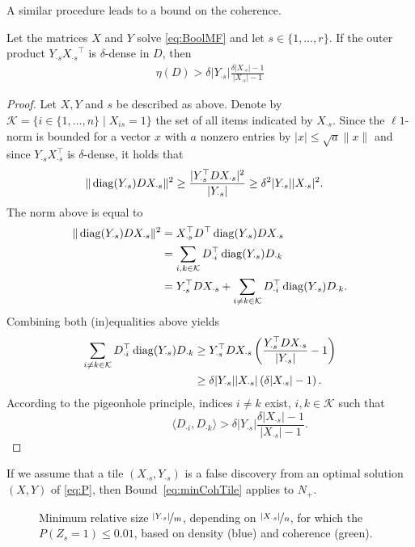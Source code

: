 %
A similar procedure leads to a bound on the coherence.
\begin{lemma} \label{thm:minCohTile}
Let the matrices $X$ and $Y$ solve \eqref{eq:BoolMF} and let $s\in\{1,\ldots,r\}$. If the outer product $Y_{\cdot s}{X_{\cdot s}}^\top$ is $\delta$-dense in $D$, then
\begin{align}
\eta(D) > \delta|Y_{\cdot s}|\frac{\delta|X_{\cdot s}|-1}{|X_{\cdot s}|-1}\label{eq:minCohTile}
\end{align}
\end{lemma}
%
\begin{proof}
Let $X,Y$ and $s$ be described as above. Denote by $\mathcal{K}=\{i\in\{1,\ldots, n\}\mid X_{is}=1\}$ the set of all items indicated by $X_{\cdot s}$. Since the $\ell1$-norm is bounded for a vector $x$ with $a$ nonzero entries by $|x|\leq\sqrt{a}\|x\|$ and since $Y_{\cdot s}X_{\cdot s}^\top$ is $\delta$-dense, it holds that
\begin{align*}
\|\operatorname{diag}(Y_{\cdot s})DX_{\cdot s}\|^2&\geq \frac{|Y_{\cdot s}^\top DX_{\cdot s}|^2}{|Y_{\cdot s}|}\geq \delta^2|Y_{\cdot s}||X_{\cdot s}|^2.
\end{align*} 
The norm above is equal to
\begin{align*}
\|\operatorname{diag}(Y_{\cdot s})DX_{\cdot s}\|^2& = X_{\cdot s}^\top D^\top\operatorname{diag}(Y_{\cdot s})DX_{\cdot s}\\
&=\sum_{i,k\in\mathcal{K}} D_{\cdot i}^\top \operatorname{diag}(Y_{\cdot s})D_{\cdot k}\\
&= Y_{\cdot s}^\top DX_{\cdot s}+\sum_{i\neq k\in\mathcal{K}}D_{\cdot i}^\top \operatorname{diag}(Y_{\cdot s})D_{\cdot k}.
\end{align*}
Combining both (in)equalities above yields
\begin{align*}
\sum_{i\neq k\in\mathcal{K}}D_{\cdot i}^\top \operatorname{diag}(Y_{\cdot s})D_{\cdot k}& \geq Y_{\cdot s}^\top DX_{\cdot s}\left(\frac{Y_{\cdot s}^\top DX_{\cdot s}}{|Y_{\cdot s}|}-1\right)\\
&\geq \delta|Y_{\cdot s}||X_{\cdot s}|\left(\delta|X_{\cdot s}|-1\right).
\end{align*}
According to the pigeonhole principle, indices $i\neq k$ exist, $i,k\in\mathcal{K}$ such that
\begin{displaymath}
~\qquad\qquad\quad\langle D_{\cdot i}, D_{\cdot k}\rangle
> \delta|Y_{\cdot s}|\frac{\delta|X_{\cdot s}|-1}{|X_{\cdot s}|-1}.
\end{displaymath}
\end{proof}
%
If we assume that a tile $(X_{\cdot s},Y_{\cdot s})$ is a false discovery from an optimal solution $(X,Y)$ of \eqref{eq:P}, then Bound~\eqref{eq:minCohTile} applies to $N_+$.
\begin{figure}
\centering

\caption{Minimum relative size $\nicefrac{|Y_{\cdot s}|}{m}$, depending on $\nicefrac{|X_{\cdot s}|}{n}$, for which the $P(Z_s=1)\leq 0.01$, based on density (blue) and coherence (green).}
\label{fig:theory}
\end{figure}

